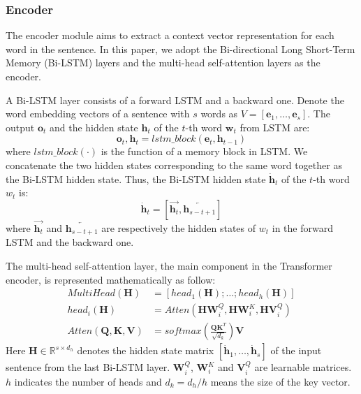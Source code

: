\documentclass[conference]{IEEEtran}
\begin{document}
\subsubsection{Encoder}
The encoder module aims to extract a context vector representation for each word in the sentence. In this paper, we adopt the Bi-directional Long Short-Term Memory (Bi-LSTM) layers and the multi-head self-attention layers as the encoder.

A Bi-LSTM layer consists of a forward LSTM \cite{Hochreiter1997Long} and a backward one. Denote the word embedding vectors of a sentence with $s$ words as $V = [\boldsymbol{e}_1, \ldots, \boldsymbol{e}_s]$. The output $\boldsymbol{o}_t$ and the hidden state $\boldsymbol{h}_t$ of the $t$-th word $\boldsymbol{w}_t$ from LSTM are:
\begin{equation}\label{equa:LSTM}
    \boldsymbol{o}_t, \boldsymbol{h}_t = lstm\_block(\boldsymbol{e}_t, \boldsymbol{h}_{t-1})
\end{equation}
where $lstm\_block (\cdot)$ is the function of a memory block in LSTM. We concatenate the two hidden states corresponding to the same word together as the Bi-LSTM hidden state. Thus, the Bi-LSTM hidden state $\dot{\boldsymbol{h}}_t$ of the $t$-th word $w_t$ is:
\begin{equation}\label{equa:BiLSTM}
    \dot{\boldsymbol{h}}_t = [\overrightarrow{\boldsymbol{h}_t}, \overleftarrow{\boldsymbol{h}_{s-t+1}}]
\end{equation}
where $\overrightarrow{\boldsymbol{h}_t}$ and $\overleftarrow{\boldsymbol{h}_{s-t+1}}$ are respectively the hidden states of $w_t$ in the forward LSTM and the backward one. 


The multi-head self-attention layer, the main component in the Transformer \cite{Vaswani2017Attention} encoder, is represented mathematically as follow:
\begin{align}\label{euqa:multiattention}
  MultiHead(\mathbf{H}) &= [head_1(\mathbf{H}); \ldots; head_h(\mathbf{H})] \\\label{equa:head}
  head_i(\mathbf{H}) &= Atten(\mathbf{H}\mathbf{W}^{Q}_i, \mathbf{H}\mathbf{W}^{K}_i, \mathbf{H}\mathbf{V}^{Q}_i) \\\label{equal:attention}
  Atten(\mathbf{Q}, \mathbf{K}, \mathbf{V}) &= softmax(\frac{\mathbf{Q}\mathbf{K}^T}{\sqrt{d_k}})\mathbf{V}
\end{align}
Here $\mathbf{H} \in \mathbb{R}^{s \times d_h}$ denotes the hidden state matrix $[\dot{\boldsymbol{h}}_1, \ldots, \dot{\boldsymbol{h}}_s]$ of the input sentence from the last Bi-LSTM layer. $\mathbf{W}^{Q}_i$, $\mathbf{W}^{K}_i$ and $\mathbf{V}^{Q}_i$ are learnable matrices. $h$ indicates the number of heads and $d_k = d_h / h$ means the size of the key vector.
\end{document}
